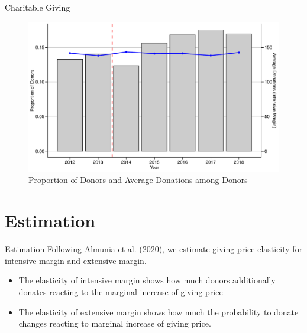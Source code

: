 \documentclass[
  ignorenonframetext,
]{beamer}
\providecommand{\tightlist}{%
  \setlength{\itemsep}{0pt}\setlength{\parskip}{0pt}}
\begin{document}
\begin{frame}{Charitable Giving}
\protect\hypertarget{charitable-giving}{}
\begin{figure}[t]

{\centering \includegraphics[width=0.9\linewidth]{slides_files/figure-beamer/SummaryOutcome-1} 

}

\caption{Proportion of Donors and Average Donations among Donors}\label{fig:SummaryOutcome}
\end{figure}
\end{frame}

\hypertarget{estimation}{%
\section{Estimation}\label{estimation}}

\begin{frame}{Estimation}
Following Almunia et al. (2020), we estimate giving price elasticity for intensive margin and extensive margin.

\begin{itemize}
\tightlist
\item
  The elasticity of intensive margin shows how much donors additionally donates reacting to the marginal increase of giving price
\item
  The elasticity of extensive margin shows how much the probability to donate changes reacting to marginal increase of giving price.
\end{itemize}
\end{frame}
\end{document}
